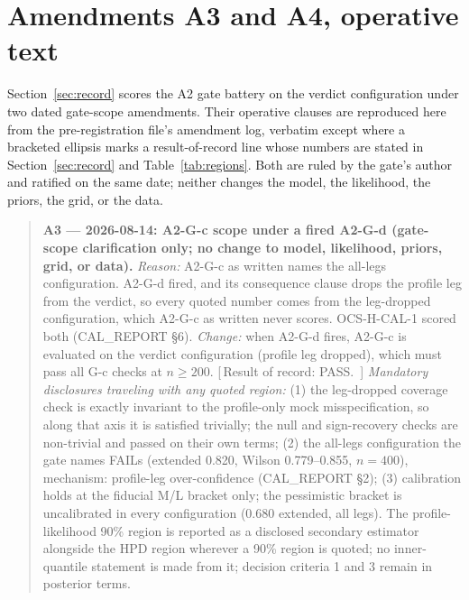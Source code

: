 \documentclass[11pt]{article}
\begin{document}
\section{Amendments A3 and A4, operative text}
\label{app:a3a4}

Section~\ref{sec:record} scores the A2 gate battery on the verdict configuration under two
dated gate-scope amendments. Their operative clauses are reproduced here from the
pre-registration file's amendment log, verbatim except where a bracketed ellipsis marks a
result-of-record line whose numbers are stated in Section~\ref{sec:record} and
Table~\ref{tab:regions}. Both are ruled by the gate's author and ratified on the same date;
neither changes the model, the likelihood, the priors, the grid, or the data.

\begin{quote}\small
\textbf{A3 --- 2026-08-14: A2-G-c scope under a fired A2-G-d (gate-scope clarification only; no
change to model, likelihood, priors, grid, or data).}
\emph{Reason:} A2-G-c as written names the all-legs configuration. A2-G-d fired, and its
consequence clause drops the profile leg from the verdict, so every quoted number comes from the
leg-dropped configuration, which A2-G-c as written never scores. OCS-H-CAL-1 scored both
(CAL\_REPORT \S6). \emph{Change:} when A2-G-d fires, A2-G-c is evaluated on the verdict
configuration (profile leg dropped), which must pass all G-c checks at $n \geq 200$.
[\,Result of record: PASS. \,]
\emph{Mandatory disclosures traveling with any quoted region:} (1) the leg-dropped coverage check
is exactly invariant to the profile-only mock misspecification, so along that axis it is satisfied
trivially; the null and sign-recovery checks are non-trivial and passed on their own terms; (2) the
all-legs configuration the gate names FAILs (extended 0.820, Wilson 0.779--0.855, $n = 400$),
mechanism: profile-leg over-confidence (CAL\_REPORT \S2); (3) calibration holds at the fiducial M/L
bracket only; the pessimistic bracket is uncalibrated in every configuration (0.680 extended, all
legs). The profile-likelihood 90\% region is reported as a disclosed secondary estimator alongside
the HPD region wherever a 90\% region is quoted; no inner-quantile statement is made from it;
decision criteria 1 and 3 remain in posterior terms.
\end{quote}
\end{document}
